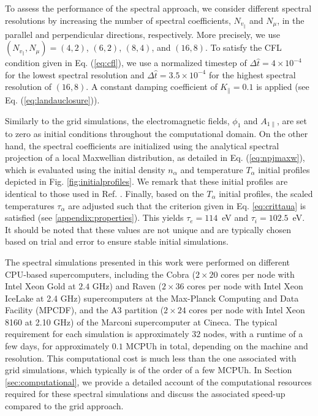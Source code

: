 \documentclass[preprint,12pt]{elsarticle}
\renewcommand{\a}{\alpha}
\newcommand{\nref}{n_{\mathrm{ref}}}
\newcommand{\Tref}{T_{\mathrm{ref}}}
\begin{document}
To assess the performance of the spectral approach, we consider different spectral resolutions by increasing the number of spectral coefficients, $N_{v_\parallel}$ and $N_\mu$, in the parallel and perpendicular directions, respectively. More precisely, we use $(N_{v_\parallel}, N_\mu) = (4,2)$, $(6,2)$, $(8,4)$, and $(16,8)$. To satisfy the CFL condition given in Eq. (\ref{eq:cfl}), we use a normalized timestep of $\Delta \hat{t} = 4 \times 10^{-4}$ for the lowest spectral resolution and $\Delta \hat{t} = 3.5 \times 10^{-4}$ for the highest spectral resolution of $(16,8)$. A constant damping coefficient of $K_\parallel = 0.1$ is applied (see Eq. (\ref{eq:landauclosure})). 


 Similarly to the grid simulations, the electromagnetic fields, $\phi_1$ and $A_{1 \parallel}$, are set to zero as initial conditions throughout the computational domain. On the other hand, the spectral coefficients are initialized using the analytical spectral projection of a local Maxwellian distribution, as detailed in Eq. (\ref{eq:npjmaxw}), which is evaluated using the initial density $n_\a$ and temperature $T_\a$ initial profiles depicted in Fig. \ref{fig:initialprofiles}. We remark that these initial profiles are identical to those used in Ref. \cite{ulbl2023}. Finally, based on the $T_\alpha$ initial profiles, the scaled temperatures $\tau_\alpha$ are adjusted such that the criterion given in Eq. \ref{eq:crittaua} is satisfied (see \ref{appendix:properties}). This yields $\tau_e = 114$~eV and $\tau_i = 102.5$~eV. It should be noted that these values are not unique and are typically chosen based on trial and error to ensure stable initial simulations.

The spectral simulations presented in this work were performed on different CPU-based supercomputers, including the Cobra ($2 \times 20$ cores per node with Intel Xeon Gold at $2.4$ GHz) and Raven ($2 \times 36$ cores per node with Intel Xeon IceLake at 2.4 GHz) supercomputers at the Max-Planck Computing and Data Facility (MPCDF), and the A3 partition ($2 \times 24$ cores per node with Intel Xeon 8160 at 2.10 GHz) of the Marconi supercomputer at Cineca. The typical requirement for each simulation is approximately $32$ nodes, with a runtime of a few days, for approximately $0.1$ MCPUh in total, depending on the machine and resolution. This computational cost is much less than the one associated with grid simulations, which typically is of the order of a few MCPUh. In Section \ref{sec:computational}, we provide a detailed account of the computational resources required for these spectral simulations and discuss the associated speed-up compared to the grid approach.
\end{document}
